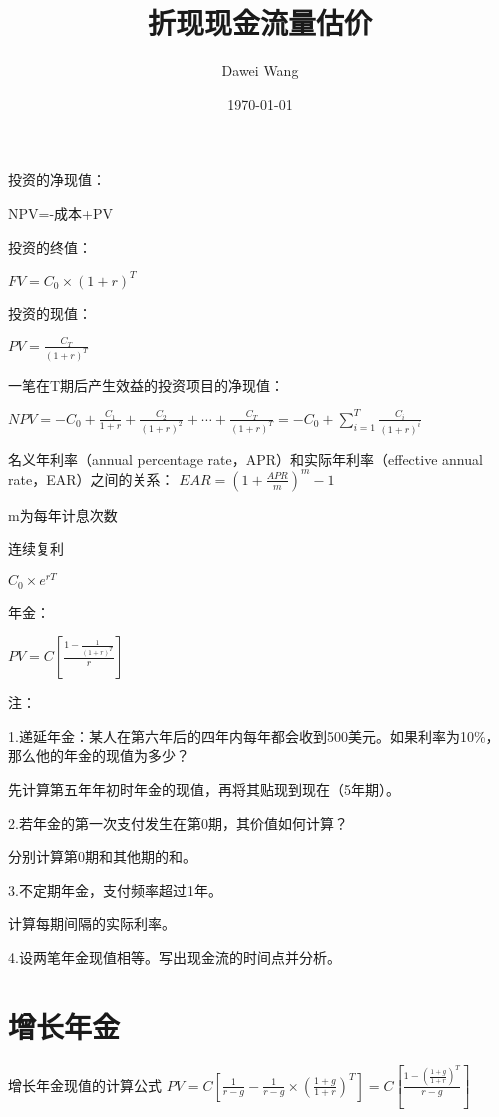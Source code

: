 \documentclass{article}
\title{折现现金流量估价}
\author{Dawei Wang}
\date{\today}
\begin{document}
	\maketitle
投资的净现值：

NPV=-成本+PV

\hspace*{\fill}

投资的终值：

$ FV=C_0\times (1+r)^T $

\hspace*{\fill}

投资的现值：

$ PV=\frac{C_T}{(1+r)^T} $

\hspace*{\fill}

一笔在T期后产生效益的投资项目的净现值：

$ NPV=-C_0+\frac{C_1}{1+r}+\frac{C_2}{(1+r)^2}+\cdots+\frac{C_T}{(1+r)^T}=-C_0+\sum_{i=1}^{T}\frac{C_i}{(1+r)^i} $

\hspace*{\fill}

名义年利率（annual percentage rate，APR）和实际年利率（effective annual rate，EAR）之间的关系：
$ EAR=(1+\frac{APR}{m})^m-1 $

m为每年计息次数

\hspace*{\fill}

连续复利

$ C_0\times e^{rT} $

\hspace*{\fill}

年金：

$ PV=C[\frac{1-\frac{1}{(1+r)^T}}{r}] $

\hspace*{\fill}

注：

1.递延年金：某人在第六年后的四年内每年都会收到500美元。如果利率为10\%，那么他的年金的现值为多少？

先计算第五年年初时年金的现值，再将其贴现到现在（5年期）。

\hspace*{\fill}

2.若年金的第一次支付发生在第0期，其价值如何计算？

分别计算第0期和其他期的和。

\hspace*{\fill}

3.不定期年金，支付频率超过1年。

计算每期间隔的实际利率。

\hspace*{\fill}

4.设两笔年金现值相等。写出现金流的时间点并分析。

\hspace*{\fill}

\section{增长年金}
增长年金现值的计算公式
$ PV=C[\frac{1}{r-g}-\frac{1}{r-g}\times(\frac{1+g}{1+r})^T]=C[\frac{1-(\frac{1+g}{1+r})^T}{r-g}] $
\end{document}
